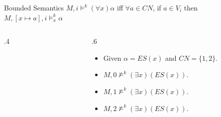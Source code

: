\documentclass [serif,professionalfont]{beamer}
\begin{document}
\begin{frame}{Bounded Semantics}
    $M,i \models^{k} (\forall x)\alpha$ iff $\forall a\in CN$, if $a \in V_i$ then $M,[x\mapsto a],i\models^{k}_x \alpha$
    \begin{columns}[T]
        \begin{column}{.4\textwidth}
            \begin{figure}
                \begin{center}
                    \scalebox{0.8}{}
                \end{center}
            \end{figure}
        \end{column}
        \hfill
        \begin{column}{.6\textwidth}
            \begin{itemize}
                \item[]
                    Given $\alpha=ES(x)$ and  $CN=\{1,2\}$.
                \item $M,0 \not\models^{k} (\exists x)(ES(x))$.
                \item $M,1 \not\models^{k} (\exists x)(ES(x))$.
                \item $M,2 \not\models^{k} (\exists x)(ES(x))$.
            \end{itemize}
        \end{column}
    \end{columns}
\end{frame}
\end{document}
